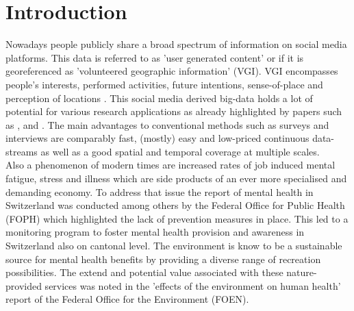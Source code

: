 \chapter{Introduction}
Nowadays people publicly share a broad spectrum of information on social media platforms. This data is referred to as 'user generated content' or if it is georeferenced as 'volunteered geographic information' (VGI). VGI encompasses people's interests, performed activities, future intentions, sense-of-place and perception of locations \parencite{Goodchild2007}. This social media derived big-data holds a lot of potential for various research applications as already highlighted by papers such as \parencite{DiMinin2015}, \parencite{DiMinin2017} and \parencite{Meentemeyer2016}. The main advantages to conventional methods such as surveys and interviews are comparably fast, (mostly) easy and low-priced continuous data-streams as well as a good spatial and temporal coverage at multiple scales.\\
Also a phenomenon of modern times are increased rates of job induced mental fatigue, stress and illness which are side products of an ever more specialised and demanding economy. To address that issue the report of mental health in Switzerland \parencite{Ruesch2003} was conducted among others by the Federal Office for Public Health (FOPH) which highlighted the lack of prevention measures in place. This led to a monitoring program to foster mental health provision and awareness in Switzerland \parencite{Schuler2012} also on cantonal level. The environment is know to be a sustainable source for mental health benefits by providing a diverse range of recreation possibilities. The extend and potential value associated with these nature-provided services was noted in the 'effects of the environment on human health' report \parencite{Ragettli2017} of the Federal Office for the Environment (FOEN).\\
\newline
